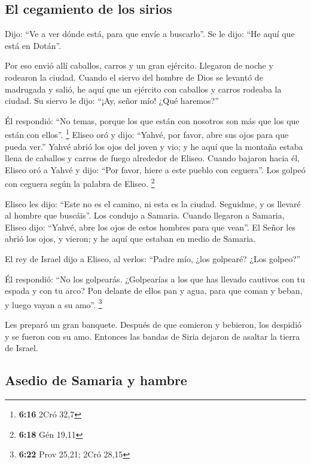 \hypertarget{el-cegamiento-de-los-sirios}{%
\subsection{El cegamiento de los
sirios}\label{el-cegamiento-de-los-sirios}}

 Dijo: ``Ve a ver dónde está, para que envíe a
buscarlo''. Se le dijo: ``He aquí que está en Dotán''.

 Por eso envió allí caballos, carros y un gran ejército.
Llegaron de noche y rodearon la ciudad.  Cuando el siervo
del hombre de Dios se levantó de madrugada y salió, he aquí que un
ejército con caballos y carros rodeaba la ciudad. Su siervo le dijo:
``¡Ay, señor mío! ¿Qué haremos?''

 Él respondió: ``No temas, porque los que están con
nosotros son más que los que están con ellos''. \footnote{\textbf{6:16}
  2Cró 32,7}  Eliseo oró y dijo: ``Yahvé, por favor, abre
sus ojos para que pueda ver.'' Yahvé abrió los ojos del joven y vio; y
he aquí que la montaña estaba llena de caballos y carros de fuego
alrededor de Eliseo.  Cuando bajaron hacia él, Eliseo oró
a Yahvé y dijo: ``Por favor, hiere a este pueblo con ceguera''. Los
golpeó con ceguera según la palabra de Eliseo. \footnote{\textbf{6:18}
  Gén 19,11}

 Eliseo les dijo: ``Este no es el camino, ni esta es la
ciudad. Seguidme, y os llevaré al hombre que buscáis''. Los condujo a
Samaria.  Cuando llegaron a Samaria, Eliseo dijo:
``Yahvé, abre los ojos de estos hombres para que vean''. El Señor les
abrió los ojos, y vieron; y he aquí que estaban en medio de Samaria.

 El rey de Israel dijo a Eliseo, al verlos: ``Padre mío,
¿los golpearé? ¿Los golpeo?''

 Él respondió: ``No los golpearás. ¿Golpearías a los que
has llevado cautivos con tu espada y con tu arco? Pon delante de ellos
pan y agua, para que coman y beban, y luego vayan a su amo''.
\footnote{\textbf{6:22} Prov 25,21; 2Cró 28,15}

 Les preparó un gran banquete. Después de que comieron y
bebieron, los despidió y se fueron con su amo. Entonces las bandas de
Siria dejaron de asaltar la tierra de Israel.

\hypertarget{asedio-de-samaria-y-hambre}{%
\subsection{Asedio de Samaria y
hambre}\label{asedio-de-samaria-y-hambre}}

